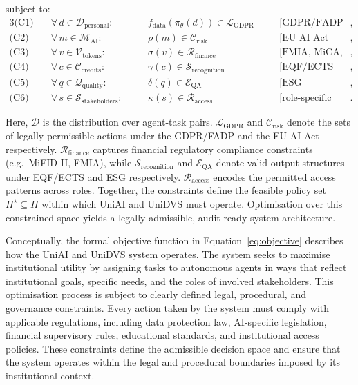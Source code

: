 \documentclass[oneside,10pt]{swissi}
\begin{document}
subject to:
\begin{alignat}{3}
\text{(C1)} \quad & \forall\, d \in \mathcal{D}_{\text{personal}}:  &\quad& f_{\text{data}}(\pi_\theta(d)) \in \mathcal{L}_{\text{GDPR}}     &\quad& \text{[GDPR/FADP compliance]}, \nonumber \\
\text{(C2)} \quad & \forall\, m \in \mathcal{M}_{\text{AI}}:         && \rho(m) \in \mathcal{C}_{\text{risk}}                                && \text{[EU AI Act classification]}, \nonumber \\
\text{(C3)} \quad & \forall\, v \in \mathcal{V}_{\text{tokens}}:     && \sigma(v) \in \mathcal{R}_{\text{finance}}                          && \text{[FMIA, MiCA, AMLD]}, \nonumber \\
\text{(C4)} \quad & \forall\, c \in \mathcal{C}_{\text{credits}}:    && \gamma(c) \in \mathcal{S}_{\text{recognition}}                     && \text{[EQF/ECTS alignment]}, \nonumber \\
\text{(C5)} \quad & \forall\, q \in \mathcal{Q}_{\text{quality}}:    && \delta(q) \in \mathcal{E}_{\text{QA}}                              && \text{[ESG compliance]}, \nonumber \\
\text{(C6)} \quad & \forall\, s \in \mathcal{S}_{\text{stakeholders}}: && \kappa(s) \in \mathcal{R}_{\text{access}}                        && \text{[role-specific access control]}.
\end{alignat}

Here, $\mathcal{D}$ is the distribution over agent-task pairs. $\mathcal{L}_{\text{GDPR}}$ and $\mathcal{C}_{\text{risk}}$ denote the sets of legally permissible actions under the GDPR/FADP and the EU AI Act respectively. $\mathcal{R}_{\text{finance}}$ captures financial regulatory compliance constraints (e.g.\ MiFID II, FMIA), while $\mathcal{S}_{\text{recognition}}$ and $\mathcal{E}_{\text{QA}}$ denote valid output structures under EQF/ECTS and ESG respectively. $\mathcal{R}_{\text{access}}$ encodes the permitted access patterns across roles. Together, the constraints define the feasible policy set $\Pi^\star \subseteq \Pi$ within which UniAI and UniDVS must operate. Optimisation over this constrained space yields a legally admissible, audit-ready system architecture.

Conceptually, the formal objective function in Equation~\ref{eq:objective} describes how the UniAI and UniDVS system operates. The system seeks to maximise institutional utility by assigning tasks to autonomous agents in ways that reflect institutional goals, specific needs, and the roles of involved stakeholders. This optimisation process is subject to clearly defined legal, procedural, and governance constraints. Every action taken by the system must comply with applicable regulations, including data protection law, AI-specific legislation, financial supervisory rules, educational standards, and institutional access policies. These constraints define the admissible decision space and ensure that the system operates within the legal and procedural boundaries imposed by its institutional context.
\end{document}
